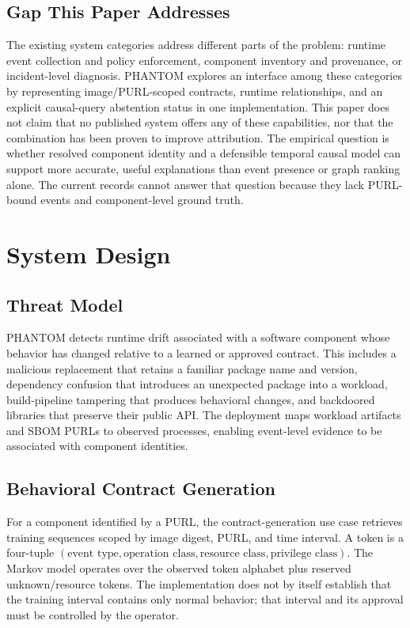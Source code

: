 \documentclass[conference]{IEEEtran}
\begin{document}
\subsection{Gap This Paper Addresses}
The existing system categories address different parts of the problem: runtime event collection and policy enforcement, component inventory and provenance, or incident-level diagnosis. PHANTOM explores an interface among these categories by representing image/PURL-scoped contracts, runtime relationships, and an explicit causal-query abstention status in one implementation. This paper does not claim that no published system offers any of these capabilities, nor that the combination has been proven to improve attribution. The empirical question is whether resolved component identity and a defensible temporal causal model can support more accurate, useful explanations than event presence or graph ranking alone. The current records cannot answer that question because they lack PURL-bound events and component-level ground truth.

\section{System Design}
\subsection{Threat Model}
PHANTOM detects runtime drift associated with a software component whose behavior has changed relative to a learned or approved contract. This includes a malicious replacement that retains a familiar package name and version, dependency confusion that introduces an unexpected package into a workload, build-pipeline tampering that produces behavioral changes, and backdoored libraries that preserve their public API. The deployment maps workload artifacts and SBOM PURLs to observed processes, enabling event-level evidence to be associated with component identities.



\subsection{Behavioral Contract Generation}
For a component identified by a PURL, the contract-generation use case retrieves training sequences scoped by image digest, PURL, and time interval. A token is a four-tuple $(\text{event type},\text{operation class},\text{resource class},\text{privilege class})$. The Markov model operates over the observed token alphabet plus reserved unknown/resource tokens. The implementation does not by itself establish that the training interval contains only normal behavior; that interval and its approval must be controlled by the operator.
\end{document}
